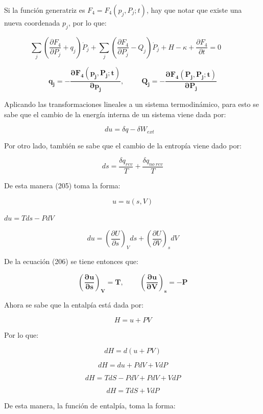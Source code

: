 \documentclass[]{article}
\begin{document}
Si la función generatriz es
\(F_{4} = F_{4}\left( p_{j},P_{j};t \right)\), hay que notar que existe
una nueva coordenada \(p_{j}\), por lo que:

\[\sum_{j}^{}\left( \frac{\partial F_{4}}{\partial P_{j}} + q_{j} \right){\dot{P}}_{j} + \sum_{j}^{}\left( \frac{\partial F_{4}}{\partial P_{j}} - Q_{j} \right){\dot{P}}_{j} + H - \kappa + \frac{\partial F_{4}}{\partial t} = 0\ \ \ \ \ \ \ \ \ \]

\[\mathbf{q}_{\mathbf{j}}\mathbf{= -}\frac{\mathbf{\partial}\mathbf{F}_{\mathbf{4}}\left( \mathbf{p}_{\mathbf{j}}\mathbf{,}\mathbf{P}_{\mathbf{j}}\mathbf{;t} \right)}{\mathbf{\partial}\mathbf{p}_{\mathbf{j}}}\mathbf{,\ \ \ \ \ \ \ \ \ \ \ }\mathbf{Q}_{\mathbf{j}}\mathbf{= -}\frac{\mathbf{\partial}\mathbf{F}_{\mathbf{4}}\left( \mathbf{P}_{\mathbf{j}}\mathbf{,}\mathbf{P}_{\mathbf{j}}\mathbf{;t} \right)}{\mathbf{\partial}\mathbf{P}_{\mathbf{j}}}\]

Aplicando las transformaciones lineales a un sistema termodinámico, para
esto se sabe que el cambio de la energía interna de un sistema viene
dada por:

\[du = \delta q - \delta W_{ext}\ \ \ \ \]

Por otro lado, también se sabe que el cambio de la entropía viene dado
por:

\[ds = \frac{\delta q_{rev}}{T} + \frac{\delta q_{no\ rev}}{T}\]

De esta manera (205) toma la forma:

\[u = u(s,V)\]

\(du = Tds - PdV\)

\[du = \left( \frac{\partial U}{\partial s} \right)_{V}ds + \left( \frac{\partial U}{\partial V} \right)_{s}dV\]

De la ecuación (206) se tiene entonces que:

\[\left( \frac{\mathbf{\partial u}}{\mathbf{\partial s}} \right)_{\mathbf{V}}\mathbf{= T,}\mathbf{\ \ \ \ \ \ \ \ \ \ }\left( \frac{\mathbf{\partial u}}{\mathbf{\partial V}} \right)_{\mathbf{s}}\mathbf{= - P}\]

Ahora se sabe que la entalpía está dada por:

\[H = u + PV\]

Por lo que:

\[dH = d(u + PV)\]

\[dH = du + PdV + VdP\]

\[dH = TdS - PdV + PdV + VdP\]

\[dH = TdS + VdP\]

De esta manera, la función de entalpía, toma la forma:
\end{document}
